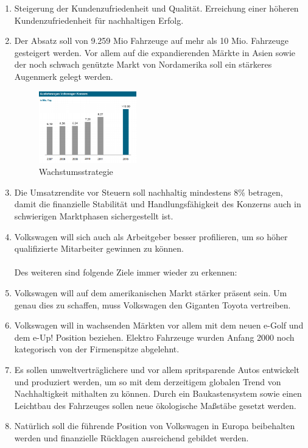 \documentclass[12pt]{article}
\begin{document}
\begin{enumerate}
\item Steigerung der Kundenzufriedenheit und Qualität. Erreichung einer höheren Kundenzufriedenheit für nachhaltigen Erfolg.
\item Der Absatz soll von 9.259 Mio Fahrzeuge auf mehr als 10 Mio. Fahrzeuge gesteigert werden.  Vor allem auf die expandierenden Märkte in Asien sowie der noch schwach genützte Markt von Nordamerika soll ein stärkeres Augenmerk gelegt werden.
\begin{figure}[!h]
\centering
\includegraphics[width=0.4\textwidth]{images/strategie}
\caption{ Wachstumsstrategie \cite{vwamstrategie3}}
\end{figure}\FloatBarrier
\noindent
\item Die Umsatzrendite vor Steuern soll nachhaltig mindestens 8\% betragen, damit die finanzielle Stabilität und Handlungsfähigkeit des Konzerns auch in schwierigen Marktphasen sichergestellt ist. 
\item Volkswagen will sich auch als Arbeitgeber besser profilieren, um so höher qualifizierte Mitarbeiter gewinnen zu können.  \\\\
Des weiteren sind folgende Ziele immer wieder zu erkennen: \\
\item Volkswagen will auf dem amerikanischen Markt stärker präsent sein. Um genau dies zu schaffen, muss Volkswagen den Giganten Toyota vertreiben. \cite{ec1}
\item Volkswagen will in wachsenden Märkten vor allem mit dem neuen e-Golf und dem e-Up! Position beziehen. Elektro Fahrzeuge wurden Anfang 2000 noch kategorisch von der Firmenspitze abgelehnt. \cite{ec3} 
\item Es sollen umweltverträglichere und vor allem spritsparende Autos entwickelt und produziert werden, um so mit dem derzeitigem globalen Trend von Nachhaltigkeit mithalten zu können. Durch ein Baukastensystem sowie einen Leichtbau des Fahrzeuges sollen neue ökologische Maßstäbe gesetzt werden.
\item Natürlich soll die führende Position von Volkswagen in Europa beibehalten werden und finanzielle Rücklagen ausreichend gebildet werden.

\end{enumerate}
\end{document}
